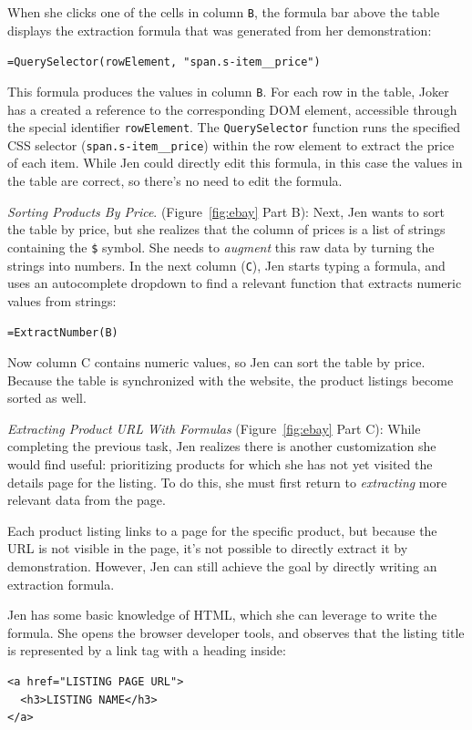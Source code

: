 \documentclass[conference]{IEEEtran}
\begin{document}
When she clicks one of the cells in column \texttt{B}, the formula bar
above the table displays the extraction formula that was generated from
her demonstration:

\texttt{=QuerySelector(rowElement,\ "span.s-item\_\_price")}

This formula produces the values in column \texttt{B}. For each row in
the table, Joker has a created a reference to the corresponding DOM
element, accessible through the special identifier \texttt{rowElement}.
The \texttt{QuerySelector} function runs the specified CSS selector
(\texttt{span.s-item\_\_price}) within the row element to extract the
price of each item. While Jen could directly edit this formula, in this
case the values in the table are correct, so there's no need to edit the
formula.

\emph{Sorting Products By Price}. (Figure~\ref{fig:ebay} Part B): Next,
Jen wants to sort the table by price, but she realizes that the column
of prices is a list of strings containing the \texttt{\$} symbol. She
needs to \emph{augment} this raw data by turning the strings into
numbers. In the next column (\texttt{C}), Jen starts typing a formula,
and uses an autocomplete dropdown to find a relevant function that
extracts numeric values from strings:

\texttt{=ExtractNumber(B)}

Now column C contains numeric values, so Jen can sort the table by
price. Because the table is synchronized with the website, the product
listings become sorted as well.

\emph{Extracting Product URL With Formulas} (Figure~\ref{fig:ebay} Part
C): While completing the previous task, Jen realizes there is another
customization she would find useful: prioritizing products for which she
has not yet visited the details page for the listing. To do this, she
must first return to \emph{extracting} more relevant data from the page.

Each product listing links to a page for the specific product, but
because the URL is not visible in the page, it's not possible to
directly extract it by demonstration. However, Jen can still achieve the
goal by directly writing an extraction formula.

Jen has some basic knowledge of HTML, which she can leverage to write
the formula. She opens the browser developer tools, and observes that
the listing title is represented by a link tag with a heading inside:

\begin{verbatim}
<a href="LISTING PAGE URL">
  <h3>LISTING NAME</h3>
</a>
\end{verbatim}
\end{document}

